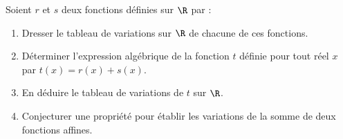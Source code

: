 \begin{exo}{}
	Soient $r$ et $s$ deux fonctions définies sur $\R$ par : 
	\begin{enumerate}
		\item Dresser le tableau de variations sur $\R$ de chacune de ces fonctions.
		\item Déterminer l'expression algébrique de la fonction $t$ définie pour tout réel $x$ par $t(x) = r(x) + s(x)$.
		\item En déduire le tableau de variations de $t$ sur $\R$.
		\item Conjecturer une propriété pour établir les variations de la somme de deux fonctions affines.
	\end{enumerate}
\end{exo}
